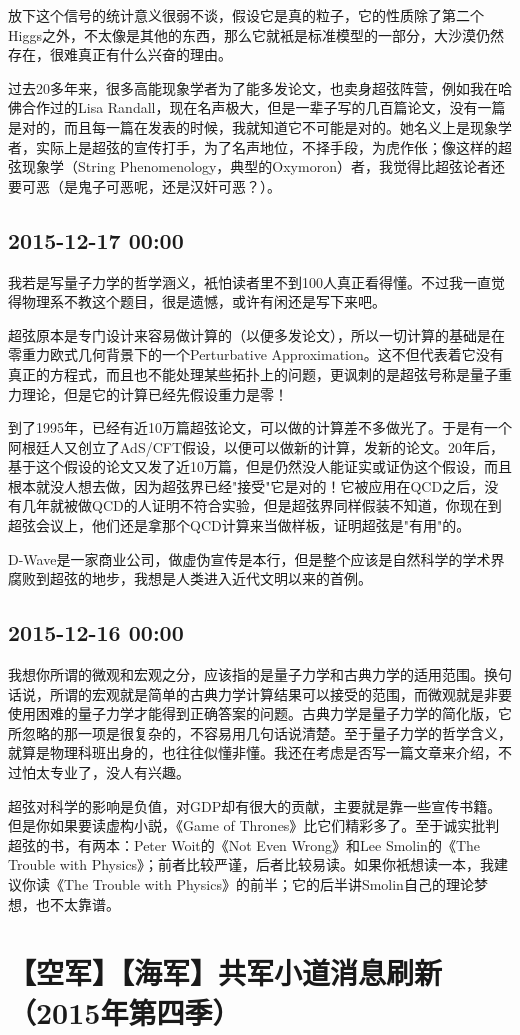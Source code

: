 \documentclass[twocolumn]{ctexart}
\begin{document}
放下这个信号的统计意义很弱不谈，假设它是真的粒子，它的性质除了第二个Higgs之外，不太像是其他的东西，那么它就衹是标准模型的一部分，大沙漠仍然存在，很难真正有什么兴奋的理由。

过去20多年来，很多高能现象学者为了能多发论文，也卖身超弦阵营，例如我在哈佛合作过的Lisa Randall，现在名声极大，但是一辈子写的几百篇论文，没有一篇是对的，而且每一篇在发表的时候，我就知道它不可能是对的。她名义上是现象学者，实际上是超弦的宣传打手，为了名声地位，不择手段，为虎作伥；像这样的超弦现象学（String Phenomenology，典型的Oxymoron）者，我觉得比超弦论者还要可恶（是鬼子可恶呢，还是汉奸可恶？）。\subsection*{2015-12-17 00:00}
我若是写量子力学的哲学涵义，衹怕读者里不到100人真正看得懂。不过我一直觉得物理系不教这个题目，很是遗憾，或许有闲还是写下来吧。

超弦原本是专门设计来容易做计算的（以便多发论文），所以一切计算的基础是在零重力欧式几何背景下的一个Perturbative Approximation。这不但代表着它没有真正的方程式，而且也不能处理某些拓扑上的问题，更讽刺的是超弦号称是量子重力理论，但是它的计算已经先假设重力是零！

到了1995年，已经有近10万篇超弦论文，可以做的计算差不多做光了。于是有一个阿根廷人又创立了AdS/CFT假设，以便可以做新的计算，发新的论文。20年后，基于这个假设的论文又发了近10万篇，但是仍然没人能证实或证伪这个假设，而且根本就没人想去做，因为超弦界已经"接受"它是对的！它被应用在QCD之后，没有几年就被做QCD的人证明不符合实验，但是超弦界同样假装不知道，你现在到超弦会议上，他们还是拿那个QCD计算来当做样板，证明超弦是"有用"的。

D-Wave是一家商业公司，做虚伪宣传是本行，但是整个应该是自然科学的学术界腐败到超弦的地步，我想是人类进入近代文明以来的首例。\subsection*{2015-12-16 00:00}
我想你所谓的微观和宏观之分，应该指的是量子力学和古典力学的适用范围。换句话说，所谓的宏观就是简单的古典力学计算结果可以接受的范围，而微观就是非要使用困难的量子力学才能得到正确答案的问题。古典力学是量子力学的简化版，它所忽略的那一项是很复杂的，不容易用几句话说清楚。至于量子力学的哲学含义，就算是物理科班出身的，也往往似懂非懂。我还在考虑是否写一篇文章来介绍，不过怕太专业了，没人有兴趣。

超弦对科学的影响是负值，对GDP却有很大的贡献，主要就是靠一些宣传书籍。但是你如果要读虚构小説，《Game of Thrones》比它们精彩多了。至于诚实批判超弦的书，有两本：Peter Woit的《Not Even Wrong》和Lee Smolin的《The Trouble with Physics》；前者比较严谨，后者比较易读。如果你衹想读一本，我建议你读《The Trouble with Physics》的前半；它的后半讲Smolin自己的理论梦想，也不太靠谱。\section*{【空军】【海军】共军小道消息刷新（2015年第四季）}
\end{document}
